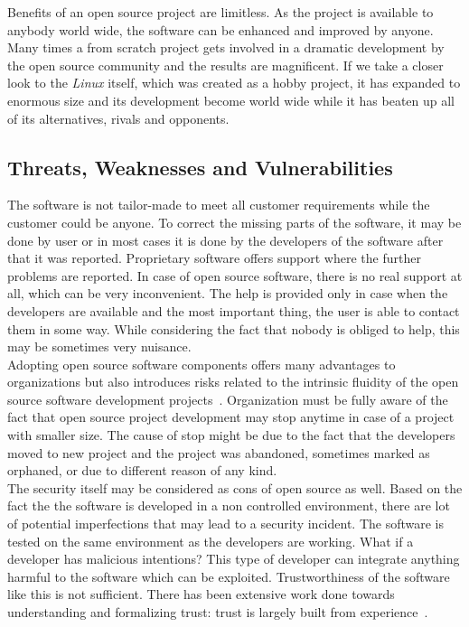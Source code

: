 \documentclass[12pt,a4paper]{article}
\theoremstyle{definition}
\begin{document}
        Benefits of an open source project are limitless. As the project is available to anybody world wide, the software can be enhanced and improved by anyone. Many times a from scratch project gets involved in a dramatic development by the open source community and the results are magnificent. If we take a closer look to the \textit{Linux} itself, which was created as a hobby project, it has expanded to enormous size and its development become world wide while it has beaten up all of its alternatives, rivals and opponents.

    \subsection{Threats, Weaknesses and Vulnerabilities}\label{FOSS:cons}

        The software is not tailor-made to meet all customer requirements while the customer could be anyone. To correct the missing parts of the software, it may be done by user or in most cases it is done by the developers of the software after that it was reported. Proprietary software offers support where the further problems are reported. In case of open source software, there is no real support at all, which can be very inconvenient. The help is provided only in case when the developers are available and the most important thing, the user is able to contact them in some way. While considering the fact that nobody is obliged to help, this may be sometimes very nuisance.\\

        Adopting open source software components offers many advantages to organizations but also introduces risks related to the intrinsic fluidity of the open source software development projects~\cite{7883433}. Organization must be fully aware of the fact that open source project development may stop anytime in case of a project with smaller size. The cause of stop might be due to the fact that the developers moved to new project and the project was abandoned, sometimes marked as orphaned, or due to different reason of any kind.\\

        The security itself may be considered as cons of open source as well. Based on the fact the the software is developed in a non controlled environment, there are lot of potential imperfections that may lead to a security incident. The software is tested on the same environment as the developers are working. What if a developer has malicious intentions? This type of developer can integrate anything harmful to the software which can be exploited. Trustworthiness of the software like this is not sufficient. There has been extensive work done towards understanding and formalizing trust: trust is largely built from experience~\cite{6340126}.
\end{document}
